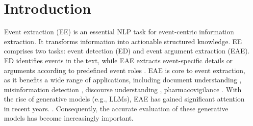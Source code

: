 \section{Introduction}
Event extraction (EE) is an essential NLP task for event-centric information extraction. It transforms information into actionable structured knowledge. EE comprises two tasks: event detection (ED) and event argument extraction (EAE). ED identifies events in the text, while EAE extracts event-specific details or arguments according to predefined event roles \cite{}. EAE is core to event extraction, as it benefits a wide range of applications, including document understanding \cite{tong-etal-2022-docee}, misinformation detection \cite{wu-etal-2022-cross}, discourse understanding \cite{sharif-etal-2024-explicit}, pharmacovigilance \cite{sun-etal-2022-phee}. With the rise of generative models (e.g., LLMs), EAE has gained significant attention in recent years. \cite{zhang-etal-2024-ultra, sun-etal-2024-leveraging, zhang-etal-2024-moka}. Consequently, the accurate evaluation of these generative models has become increasingly important.








